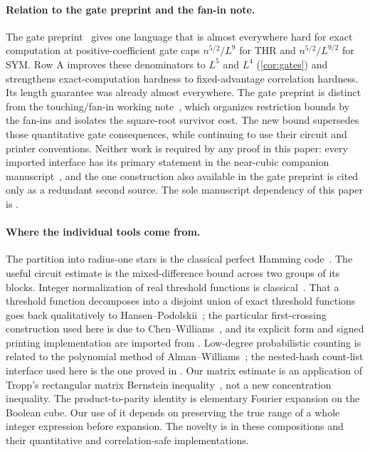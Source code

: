 \documentclass[11pt,letterpaper]{article}
\theoremstyle{definition}
\theoremstyle{remark}
\begin{document}
\paragraph{Relation to the gate preprint and the fan-in note.}
The gate preprint~\cite{NagGate} gives one language that is almost
everywhere hard for exact computation at positive-coefficient gate caps
$n^{5/2}/L^9$ for THR and $n^{5/2}/L^{9/2}$ for SYM. Row A improves
these denominators to $L^5$ and $L^4$ (\cref{cor:gates}) and
strengthens exact-computation
hardness to fixed-advantage correlation hardness. Its length guarantee
was already almost everywhere. The gate preprint is distinct from the
touching/fan-in working note~\cite{NagTouching}, which organizes
restriction bounds by the fan-ins and isolates the square-root survivor
cost. The new bound supersedes those quantitative gate
consequences, while continuing to use their circuit and printer
conventions. Neither work is required by any proof in this paper:
every imported interface has its primary statement in the near-cubic
companion manuscript~\cite{NagCubic}, and the one construction also
available in the gate preprint is cited only as a redundant second
source. The sole manuscript dependency of this paper is
\cite{NagCubic}.

\paragraph{Where the individual tools come from.}
The partition into radius-one stars is the classical perfect Hamming
code~\cite{Hamming}. The useful circuit estimate is the mixed-difference
bound across two groups of its blocks. Integer normalization of real
threshold functions is classical~\cite{MurogaTodaTakasu}.
That a threshold function decomposes into a disjoint union of exact
threshold functions goes back qualitatively to
Hansen--Podolskii~\cite{HansenPodolskii}; the particular
first-crossing construction used here is due to
Chen--Williams~\cite[Proposition 18(2), Appendix B]{ChenWilliams},
and its explicit form and signed printing implementation are imported
from \cite{NagCubic,NagGate}. Low-degree probabilistic counting is related
to the polynomial method of Alman--Williams~\cite{AlmanWilliams};
the nested-hash count-list interface used here is the one proved in
\cite{NagCubic}. Our matrix estimate is an application of Tropp's
rectangular matrix Bernstein inequality~\cite[Theorem 1.6]{Tropp},
not a new concentration inequality. The product-to-parity identity is
elementary Fourier expansion on the Boolean cube. Our use of it depends
on preserving the true range of a whole integer expression before
expansion. The novelty is in these compositions and their quantitative
and correlation-safe implementations.
\end{document}
